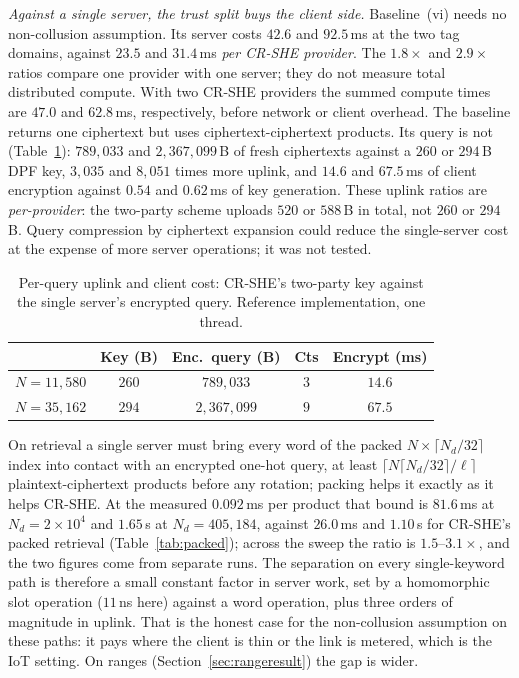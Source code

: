\documentclass[a4paper,fleqn]{cas-sc}
\begin{document}
\emph{Against a single server, the trust split buys the client side.}
Baseline~(vi) needs no non-collusion assumption. Its server costs $42.6$ and $92.5$\,ms at the two tag domains,
against $23.5$ and $31.4$\,ms \emph{per CR-SHE provider}.
The $1.8\times$ and $2.9\times$ ratios compare one provider
with one server; they do not measure total distributed compute.
With two CR-SHE providers the summed compute times are $47.0$
and $62.8$\,ms, respectively, before network or client overhead.
The baseline returns one ciphertext but uses
ciphertext-ciphertext products. Its query is not (Table~\ref{tab:uplink}):
$789{,}033$ and $2{,}367{,}099$\,B of fresh ciphertexts against a $260$ or
$294$\,B DPF key, $3{,}035$ and $8{,}051$ times more uplink, and $14.6$ and
$67.5$\,ms of client encryption against $0.54$ and $0.62$\,ms of key
generation. These uplink ratios are \emph{per-provider}: the two-party
scheme uploads $520$ or $588$\,B in total, not $260$ or $294$\,B.
Query compression by ciphertext expansion \citep{angel2018pir}
could reduce the single-server cost at the expense of more
server operations; it was not tested.

\begin{table}[pos=htbp]
\caption{Per-query uplink and client cost: CR-SHE's two-party key against the
single server's encrypted query. Reference implementation, one thread.}
\label{tab:uplink}
\centering
\footnotesize
\setlength{\tabcolsep}{3pt}
\begin{tabular*}{\tblwidth}{@{\extracolsep{\fill}}lcccc@{}}
\toprule
 & Key (B) & Enc.\ query (B) & Cts & Encrypt (ms) \\
\midrule
$N=11{,}580$ & $260$ & $789{,}033$ & $3$ & $14.6$ \\
$N=35{,}162$ & $294$ & $2{,}367{,}099$ & $9$ & $67.5$ \\
\bottomrule
\end{tabular*}
\end{table}

On retrieval a single server must bring every word of the packed
$N\times\lceil N_d/32\rceil$ index into contact with an encrypted one-hot
query, at least $\lceil N\lceil N_d/32\rceil/\ell\rceil$ plaintext-ciphertext
products before any rotation; packing helps it exactly as it helps CR-SHE. At
the measured $0.092$\,ms per product that bound is $81.6$\,ms at
$N_d=2\times10^4$ and $1.65$\,s at $N_d=405{,}184$, against $26.0$\,ms and
$1.10$\,s for CR-SHE's packed retrieval (Table~\ref{tab:packed}); across the
sweep the ratio is $1.5$--$3.1\times$, and the two figures come from separate
runs. The separation on every single-keyword path is therefore a small constant
factor in server work, set by a homomorphic slot operation ($11$\,ns here)
against a word operation, plus three orders of magnitude in uplink. That is the
honest case for the non-collusion assumption on these paths: it pays where the
client is thin or the link is metered, which is the IoT setting. On ranges
(Section~\ref{sec:rangeresult}) the gap is wider.
\end{document}
